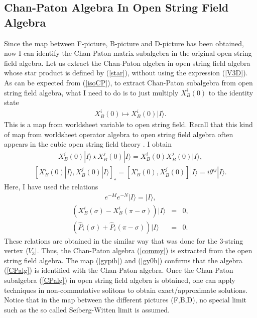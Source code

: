 \documentclass[a4paper,12pt]{article}
\def\bra{\langle}
\def\ket{\rangle}
\newcommand{\XB}{X_B}
\begin{document}
\subsection{Chan-Paton Algebra In Open String Field Algebra}

Since the map between
F-picture,
B-picture and D-picture has been obtained,
now 
I can identify
the 
Chan-Paton matrix subalgebra
in the original 
open string field algebra.
Let us extract the Chan-Paton
algebra in open string field algebra
whose star product is defined by (\ref{star}),
without using
the expression (\ref{V3D}).
As can be expected 
from (\ref{isoCP}),
to extract Chan-Paton subalgebra 
from open string field algebra,
what I need to do is to just multiply
$\XB^{i}(0)$ to the identity state
\begin{eqnarray}
 \label{mapalg}
\XB^{i}(0) \mapsto \XB^i(0) |I\ket.
\end{eqnarray}
This is a map from worldsheet variable
to open string field.
Recall that this kind of map 
from worldsheet operator algebra to 
open string field algebra
often appears
in the cubic open string field theory 
\cite{pure,MatSFT}.
I obtain
\begin{eqnarray}
 \label{SFTalg}
\XB^i(0) |I\ket \star
\XB^j(0) |I\ket
=
\XB^i(0) \XB^j(0) |I\ket ,
\end{eqnarray}
%
\begin{eqnarray}
 \label{CPalg}
[\XB^{i}(0) |I\ket,
\XB^{j} (0) |I\ket]_\star
=
[\XB^{i}(0),
\XB^{j}(0)] |I\ket
=
i \theta^{ij} |I\ket.
\end{eqnarray}
Here, I have used the relations
\begin{eqnarray}
 \label{hII}
 e^{-M}e^{-N} | I \ket = | I \ket,
\end{eqnarray}
\begin{eqnarray}
 \label{hIoverlap}
\left(\XB^i(\sigma) - \XB^i(\pi-\sigma)\right) | I \ket &=& 0, \\ 
\left(\hat{P}_i(\sigma)+\hat{P}_i(\pi-\sigma) \right) | I \ket &=& 0.
\end{eqnarray}
These relations are obtained in the similar way
that was done for the 3-string vertex $\bra V_3|$.
Thus, the Chan-Paton algebra
(\ref{commy})
is extracted from the open string field algebra.
The map
(\ref{gypih}) and (\ref{gy0h})
confirms that
the algebra (\ref{CPalg})
is identified with the Chan-Paton algebra.
Once the Chan-Paton subalgebra
(\ref{CPalg}) in open string field algebra is
obtained, one can
apply techniques in non-commutative solitons
to obtain exact/approximate solutions.
Notice that in the map
between the different pictures (F,B,D),
no special limit such as 
the so called Seiberg-Witten limit \cite{NCSW}
is assumed.
\end{document}
